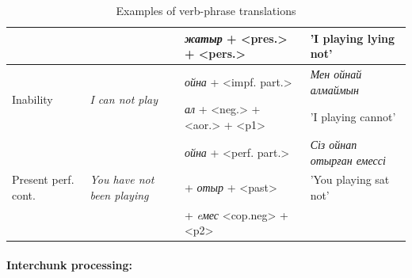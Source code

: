 \documentclass[11pt]{article}
\begin{document}
\begin{table}
\begin{small}
\begin{tabular}{|l|l|l|l|}
                                    &                         &   \emph{жатыр} + <pres.> + <pers.>     & 'I playing lying not' \\
    \hline
    \multirow{2}{*}{Inability} & \multirow{2}{*}{\emph{I can not play}} & \emph{ойна} + <impf. part.>  & \emph{Мен ойнай алмаймын} \\
                                    &                         &   \emph{ал} + <neg.> + <aor.> + <p1>     & 'I playing cannot' \\
    \hline
    \multirow{3}{*}{Present perf. cont. } & \multirow{3}{*}{\emph{You have not been playing}} & \emph{ойна} + <perf. part.>  & \emph{Сіз ойнап отырған емессі} \\
                                    &                         & +  \emph{отыр} + <past>  & 'You playing sat not'  \\
                                    &                         & + \emph{eмес} <cop.neg> + <p2> & \\
    \hline
    
     
  \end{tabular}
  \end{small}
  \caption{Examples of verb-phrase translations}
  \label{table:vps}
\end{table}

\paragraph{Interchunk processing:}
\end{document}
